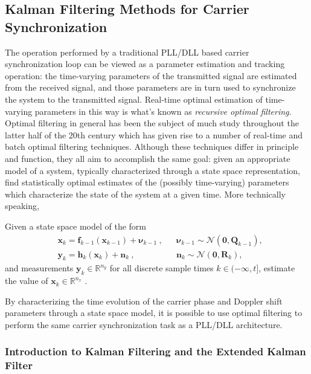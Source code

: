 \documentclass[11pt]{article}
\begin{document}
\subsection{Kalman Filtering Methods for Carrier Synchronization}

The operation performed by a traditional PLL/DLL based carrier synchronization loop can be viewed as a parameter estimation and tracking operation: the time-varying parameters of the transmitted signal are estimated from the received signal, and those parameters are in turn used to synchronize the system to the transmitted signal. Real-time optimal estimation of time-varying parameters in this way is what's known as \textit{recursive optimal filtering}. Optimal filtering in general has been the subject of much study throughout the latter half of the 20th century which has given rise to a number of real-time and batch optimal filtering techniques. Although these techniques differ in principle and function, they all aim to accomplish the same goal: given an appropriate model of a system, typically characterized through a state space representation, find statistically optimal estimates of the (possibly time-varying) parameters which characterize the state of the system at a given time. More technically speaking,

\noindent Given a state space model of the form \begin{align}
&\mathbf{x}_k = \mathbf{f}_{k-1}(\mathbf{x}_{k-1}) + \bm{\nu}_{k-1}~, & & \bm{\nu}_{k-1}\sim \mathcal{N}(\mathbf{0},\mathbf{Q}_{k-1}), \label{eq:system_state} \\
&\mathbf{y}_k = \mathbf{h}_{k}(\mathbf{x}_{k}) + \mathbf{n}_{k} ~, & & \mathbf{n}_{k}\sim \mathcal{N}(\mathbf{0},\mathbf{R}_{k}), 
\label{eq:system_meas}
\end{align}
\noindent and measurements \small$\mathbf{y}_k \in \mathbb{R}^{n_y}$ \normalsize for all discrete sample times $k \in (-\infty,t]$, estimate the value of \small$\mathbf{x}_k \in \mathbb{R}^{n_x}$ \normalsize.

By characterizing the time evolution of the carrier phase and Doppler shift parameters through a state space model, it is possible to use optimal filtering to perform the same carrier synchronization task as a PLL/DLL architecture.

\subsubsection{Introduction to Kalman Filtering and the Extended Kalman Filter}
\end{document}
